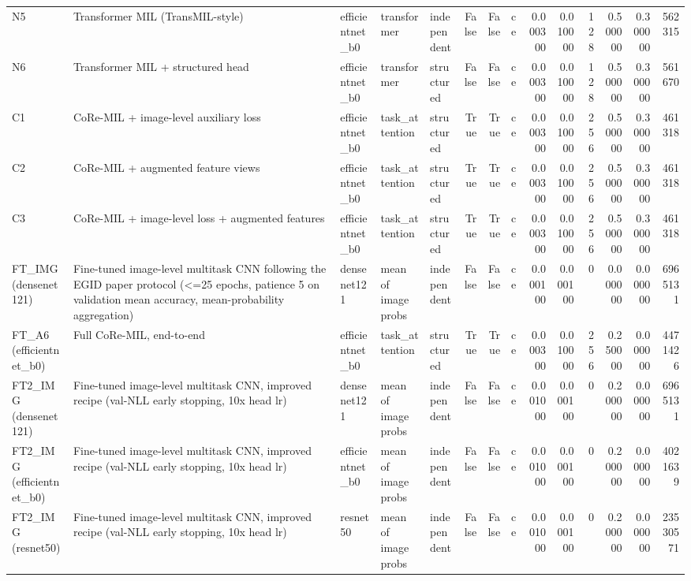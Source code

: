\begin{table}
\begin{tabular}{lllllrrlrrrrrr}
N5 & Transformer MIL (TransMIL-style) & efficientnet\_b0 & transformer & independent & False & False & ce & 0.000300 & 0.010000 & 128 & 0.500000 & 0.300000 & 562315 \\
N6 & Transformer MIL + structured head & efficientnet\_b0 & transformer & structured & False & False & ce & 0.000300 & 0.010000 & 128 & 0.500000 & 0.300000 & 561670 \\
C1 & CoRe-MIL + image-level auxiliary loss & efficientnet\_b0 & task\_attention & structured & True & True & ce & 0.000300 & 0.010000 & 256 & 0.500000 & 0.300000 & 461318 \\
C2 & CoRe-MIL + augmented feature views & efficientnet\_b0 & task\_attention & structured & True & True & ce & 0.000300 & 0.010000 & 256 & 0.500000 & 0.300000 & 461318 \\
C3 & CoRe-MIL + image-level loss + augmented features & efficientnet\_b0 & task\_attention & structured & True & True & ce & 0.000300 & 0.010000 & 256 & 0.500000 & 0.300000 & 461318 \\
FT\_IMG (densenet121) & Fine-tuned image-level multitask CNN following the EGID paper protocol (<=25 epochs, patience 5 on validation mean accuracy, mean-probability aggregation) & densenet121 & mean of image probs & independent & False & False & ce & 0.000100 & 0.000100 & 0 & 0.000000 & 0.000000 & 6965131 \\
FT\_A6 (efficientnet\_b0) & Full CoRe-MIL, end-to-end & efficientnet\_b0 & task\_attention & structured & True & True & ce & 0.000300 & 0.010000 & 256 & 0.250000 & 0.000000 & 4471426 \\
FT2\_IMG (densenet121) & Fine-tuned image-level multitask CNN, improved recipe (val-NLL early stopping, 10x head lr) & densenet121 & mean of image probs & independent & False & False & ce & 0.001000 & 0.000100 & 0 & 0.200000 & 0.000000 & 6965131 \\
FT2\_IMG (efficientnet\_b0) & Fine-tuned image-level multitask CNN, improved recipe (val-NLL early stopping, 10x head lr) & efficientnet\_b0 & mean of image probs & independent & False & False & ce & 0.001000 & 0.000100 & 0 & 0.200000 & 0.000000 & 4021639 \\
FT2\_IMG (resnet50) & Fine-tuned image-level multitask CNN, improved recipe (val-NLL early stopping, 10x head lr) & resnet50 & mean of image probs & independent & False & False & ce & 0.001000 & 0.000100 & 0 & 0.200000 & 0.000000 & 23530571 \\
\bottomrule
\end{tabular}
\end{table}
